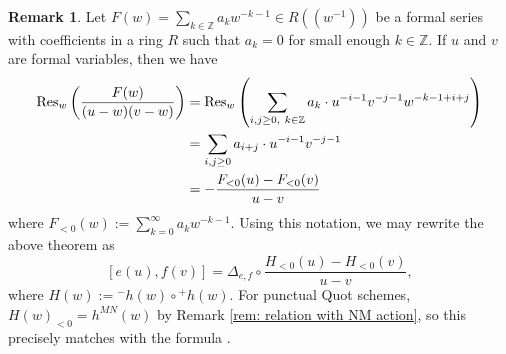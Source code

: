 \documentclass[10pt]{amsart}
\newcommand{\BZ}{\mathbb{Z}}
\newcommand{\+}{{}^+}
\newcommand{\Res}{\textnormal{Res}}
\theoremstyle{definition}
\theoremstyle {definition}
\newtheorem{remark}[theorem]{Remark}
\theoremstyle {definition}
\begin{document}
\begin{remark}
Let $F(w)=\sum_{k\in \BZ} a_kw^{-k-1}\in R(\!(w^{-1})\!)$ be a formal series with coefficients in a ring $R$ such that $a_k=0$ for small enough $k\in \BZ$. If $u$ and $v$ are formal variables, then we have
\begin{align*}
    \Res_w \left(\frac{F(w)}{(u-w)(v-w)}\right)
    &=\Res_w \left(\sum_{i, j\geq 0,\ k\in \BZ}a_k\cdot u^{-i-1}v^{-j-1}w^{-k-1+i+j}\right)\\
    &=\sum_{i,j\geq 0} a_{i+j}\cdot u^{-i-1}v^{-j-1}\\
    &=-\frac{F_{<0}(u)-F_{<0}(v)}{u-v}
\end{align*}
where $F_{<0}(w):=\sum_{k=0}^\infty a_k w^{-k-1}$. Using this notation, we may rewrite the above theorem as 
$$[e(u), f(v)]=\Delta_{e,f}\circ\frac{H_{<0}(u)-H_{<0}(v)}{u-v},
$$
where $H(w):={}^- h(w)\circ {}^+ h(w)$. For punctual Quot schemes, $H(w)_{<0}=h^{MN}(w)$ by Remark \ref{rem: relation with NM action}, so this precisely matches with the formula \cite[eq. (23)]{marian2026cohomologyquotschemesmooth}. 

    
\end{remark}
\end{document}
